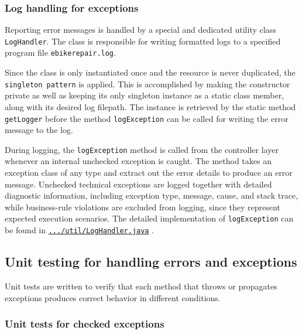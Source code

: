 \documentclass[a4paper]{scrartcl}
\begin{document}
\subsubsection{Log handling for exceptions}

Reporting error messages is handled by a special and dedicated utility class \texttt{LogHandler}. The class is responsible for writing formatted logs to a specified program file \texttt{ebikerepair.log}.

Since the class is only instantiated once and the resource is never duplicated, the \texttt{singleton pattern} is applied. This is accomplished by making the constructor private as well as keeping its only singleton instance as a static class member, along with its desired log filepath. The instance is retrieved by the static method \texttt{getLogger} before the method \texttt{logException} can be called for writing the error message to the log.

During logging, the \texttt{logException} method is called from the controller layer whenever an internal unchecked exception is caught. The method takes an exception class of any type and extract out the error details to produce an error message. Unchecked technical exceptions are logged together with detailed diagnostic information, including exception type, message, cause, and stack trace, while business-rule violations are excluded from logging, since they represent expected execution scenarios. The detailed implementation of \texttt{logException} can be found in \href{https://github.com/mo-mosverkstad/java-learning/blob/183fd32417c1e32630f41e821e872cda2c43eda9/maven-projects/ElectricBikeRepair/src/main/java/se/ebikerepair/util/LogHandler.java}{\nolinkurl{.../util/LogHandler.java}} \cite{sourcecode}.

\subsection{Unit testing for handling errors and exceptions}

Unit tests are written to verify that each method that throws or propagates exceptions produces correct behavior in different conditions.

\subsubsection{Unit tests for checked exceptions}
\end{document}
